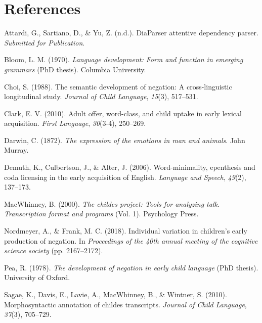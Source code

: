 \documentclass[10pt, letterpaper]{article}
\begin{document}
\hypertarget{references}{%
\section{References}\label{references}}

\setlength{\parindent}{-0.1in} 
\setlength{\leftskip}{0.125in}

\noindent

\hypertarget{refs}{}
\leavevmode\hypertarget{ref-diaparser}{}%
Attardi, G., Sartiano, D., \& Yu, Z. (n.d.). DiaParser attentive
dependency parser. \emph{Submitted for Publication}.

\leavevmode\hypertarget{ref-bloom1970language}{}%
Bloom, L. M. (1970). \emph{Language development: Form and function in
emerging grammars} (PhD thesis). Columbia University.

\leavevmode\hypertarget{ref-choi1988semantic}{}%
Choi, S. (1988). The semantic development of negation: A
cross-linguistic longitudinal study. \emph{Journal of Child Language},
\emph{15}(3), 517--531.

\leavevmode\hypertarget{ref-clark2010adult}{}%
Clark, E. V. (2010). Adult offer, word-class, and child uptake in early
lexical acquisition. \emph{First Language}, \emph{30}(3-4), 250--269.

\leavevmode\hypertarget{ref-darwin1872expression}{}%
Darwin, C. (1872). \emph{The expression of the emotions in man and
animals}. John Murray.

\leavevmode\hypertarget{ref-demuth2006word}{}%
Demuth, K., Culbertson, J., \& Alter, J. (2006). Word-minimality,
epenthesis and coda licensing in the early acquisition of English.
\emph{Language and Speech}, \emph{49}(2), 137--173.

\leavevmode\hypertarget{ref-macwhinney2000childes}{}%
MacWhinney, B. (2000). \emph{The childes project: Tools for analyzing
talk. Transcription format and programs} (Vol. 1). Psychology Press.

\leavevmode\hypertarget{ref-nordmeyer2018individual}{}%
Nordmeyer, A., \& Frank, M. C. (2018). Individual variation in
children's early production of negation. In \emph{Proceedings of the
40th annual meeting of the cognitive science society} (pp. 2167--2172).

\leavevmode\hypertarget{ref-pea1978}{}%
Pea, R. (1978). \emph{The development of negation in early child
language} (PhD thesis). University of Oxford.

\leavevmode\hypertarget{ref-sagae2010morphosyntactic}{}%
Sagae, K., Davis, E., Lavie, A., MacWhinney, B., \& Wintner, S. (2010).
Morphosyntactic annotation of childes transcripts. \emph{Journal of
Child Language}, \emph{37}(3), 705--729.
\end{document}
